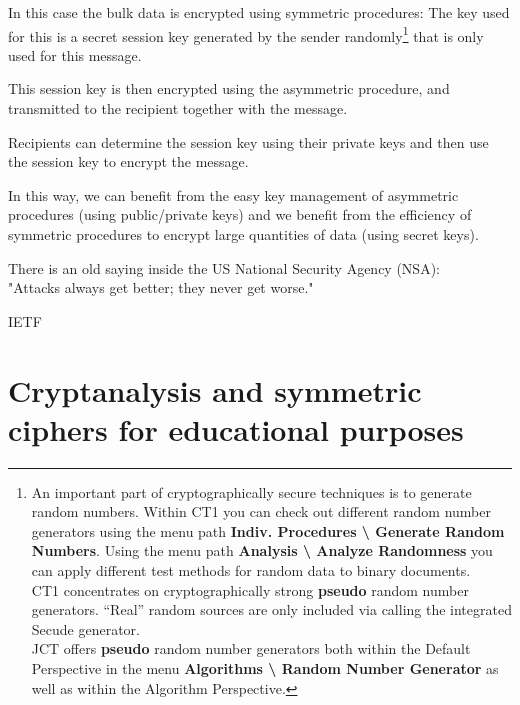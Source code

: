 In this case the bulk data is encrypted using symmetric procedures: The key
used for this is a secret session key generated by the
sender randomly\footnote{%
   An important part of cryptographically secure techniques is to generate 
   random numbers. Within CT1 you can check out
   different random number generators using the menu path
   {\bf Indiv. Procedures \textbackslash{} Generate Random Numbers}. 
   Using the menu path {\bf Analysis \textbackslash{} Analyze Randomness}
   you can apply different test methods for random data to binary documents. \\
   CT1 concentrates on cryptographically strong {\bf pseudo} random number
   generators. ``Real'' random sources are only included via calling the
   integrated Secude generator.\\
   JCT offers {\bf pseudo} random number generators both
   within the Default Perspective in the menu {\bf Algorithms \textbackslash{}
   Random Number Generator} as well as within the Algorithm Perspective.
}
that is only used for this message.

This session key is then encrypted using the asymmetric procedure, and
transmitted to the recipient together with the message.

Recipients can determine the session key using their private keys and
then use the session key to encrypt the message.

In this way, we can benefit from the easy key management
of asymmetric procedures (using public/private keys) and we benefit from the
efficiency of symmetric procedures to encrypt large quantities of data
(using secret keys).



\newpage

\begin{ctsquote}
    There is an old saying inside the US National Security Agency (NSA):\\
    "Attacks always get better; they never get worse."
\caption[IETF]{IETF\footnotemark}
\end{ctsquote}
\addtocounter{footnote}{0}

\section[Cryptanalysis and symmetric ciphers for educational purposes]{Cryptanalysis and symmetric ciphers for educational purposes\footnotemark}

